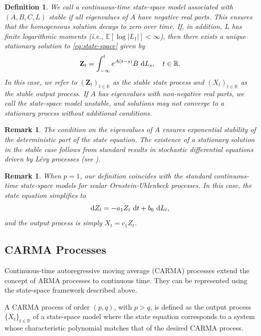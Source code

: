 \documentclass[10pt,a4paper,reqno]{amsart}
\newtheorem{definition}[theorem]{Definition}
\newtheorem{remark}[theorem]{Remark}
\theoremstyle{example}
\newcommand*\D{\mathop{}\!\textnormal{d}}
\begin{document}
\begin{definition}\label{def:stable-processes}
We call a continuous-time state-space model associated with $(A, B, C, L)$ \emph{stable} if all eigenvalues of $A$ have negative real parts. This ensures that the homogeneous solution decays to zero over time. If, in addition, $L$ has finite logarithmic moments (i.e., $\mathbb{E}\left[ \log | L_1 | \right] < \infty$), then there exists a unique stationary solution to \eqref{eq:state-space} given by
\begin{align}\label{eq:stationary-state}
\mathbf{Z}_t = \int_{-\infty}^t e^{A (t - s)} B \, \D L_s, \quad t \in \mathbb{R}.
\end{align}
In this case, we refer to $(\mathbf{Z}_t)_{t \in \mathbb{R}}$ as the \emph{stable state process} and $(X_t)_{t \in \mathbb{R}}$ as the \emph{stable output process}. If $A$ has eigenvalues with non-negative real parts, we call the state-space model \emph{unstable}, and solutions may not converge to a stationary process without additional conditions.
\end{definition}

\begin{remark}
The condition on the eigenvalues of $A$ ensures exponential stability of the deterministic part of the state equation. The existence of a stationary solution in the stable case follows from standard results in stochastic differential equations driven by L\'evy processes (see \cite{SY83, CM87}).
\end{remark}

\begin{remark}
When $p = 1$, our definition coincides with the standard continuous-time state-space models for scalar Ornstein-Uhlenbeck processes. In this case, the state equation simplifies to
\[
\D Z_t = - a_1 Z_t \, \D t + b_0 \, \D L_t,
\]
and the output process is simply $X_t = c_1 Z_t$.
\end{remark}

\subsection{CARMA Processes}

Continuous-time autoregressive moving average (CARMA) processes extend the concept of ARMA processes to continuous time. They can be represented using the state-space framework described above.

A CARMA process of order $(p, q)$, with $p > q$, is defined as the output process $\{X_t\}_{t \in \mathbb{R}}$ of a state-space model where the state equation corresponds to a system whose characteristic polynomial matches that of the desired CARMA process.
\end{document}
